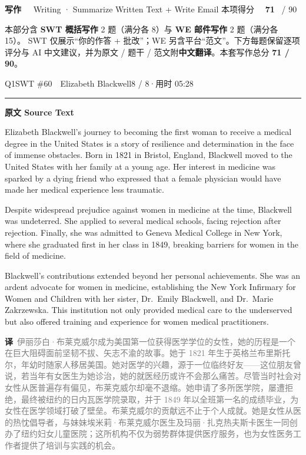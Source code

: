 \documentclass[11pt]{article}
\newcommand{\ptesub}[1]{%
  \par\needspace{2\baselineskip}\smallskip
  {\color{cAccent}\rule[-0.2ex]{3pt}{1.05em}}\hspace{6pt}%
  {\bfseries\color{cHead}#1}\par\nopagebreak\smallskip}
\newcommand{\ptesection}[3]{%
  \addcontentsline{toc}{section}{#1}%
  \needspace{6\baselineskip}
  \begin{tcolorbox}[enhanced, colback=cAccent, colframe=cAccent, sharp corners,
     left=14pt, right=14pt, top=10pt, bottom=10pt, boxrule=0pt]
    {\fontsize{20}{24}\selectfont\bfseries\color{white} #1\ \ }%
    {\large\color{white!85} #2}\hfill
    {\large\color{white}本项得分\ \ }{\fontsize{22}{24}\selectfont\bfseries\color{white} #3}%
    \ {\color{white!85}/ 90}
  \end{tcolorbox}}
\newcommand{\zh}[1]{{\footnotesize\textcolor{cNote}{\textbf{译}}\ \textcolor{gray}{#1}}}
\begin{document}
\ptesection{写作}{Writing · Summarize Written Text + Write Email}{71}

\vspace{1mm}
{\small\color{gray} 本部分含 \textbf{SWT 概括写作} 2 题（满分各 8）与 \textbf{WE 邮件写作} 2 题（满分各 15）。
SWT 仅展示“你的作答 + 批改”；WE 另含平台“范文”。下方每题保留逐项评分与 AI 中文建议，并为原文 / 题干 / 范文附\textbf{中文翻译}。本套写作总分 \textbf{71 / 90}。}
\vspace{2mm}


\begin{qblock}{Q1\quad SWT \#60\ \ Elizabeth Blackwell}{8 / 8\quad·\quad 用时 05:28}

\ptesub{原文 Source Text}
\begin{promptbox}
Elizabeth Blackwell's journey to becoming the first woman to receive a medical degree in the United States is a story of resilience and determination in the face of immense obstacles. Born in 1821 in Bristol, England, Blackwell moved to the United States with her family at a young age. Her interest in medicine was sparked by a dying friend who expressed that a female physician would have made her medical experience less traumatic.

Despite widespread prejudice against women in medicine at the time, Blackwell was undeterred. She applied to several medical schools, facing rejection after rejection. Finally, she was admitted to Geneva Medical College in New York, where she graduated first in her class in 1849, breaking barriers for women in the field of medicine.

Blackwell's contributions extended beyond her personal achievements. She was an ardent advocate for women in medicine, establishing the New York Infirmary for Women and Children with her sister, Dr.\ Emily Blackwell, and Dr.\ Marie Zakrzewska. This institution not only provided medical care to the underserved but also offered training and experience for women medical practitioners.
\end{promptbox}
\zh{伊丽莎白·布莱克威尔成为美国第一位获得医学学位的女性，她的历程是一个在巨大阻碍面前坚韧不拔、矢志不渝的故事。她于 1821 年生于英格兰布里斯托尔，年幼时随家人移居美国。她对医学的兴趣，源于一位临终好友——这位朋友曾说，若当年有女医生为她诊治，她的就医经历或许不会那么痛苦。尽管当时社会对女性从医普遍存有偏见，布莱克威尔却毫不退缩。她申请了多所医学院，屡遭拒绝，最终被纽约的日内瓦医学院录取，并于 1849 年以全班第一名的成绩毕业，为女性在医学领域打破了壁垒。布莱克威尔的贡献远不止于个人成就。她是女性从医的热忱倡导者，与妹妹埃米莉·布莱克威尔医生及玛丽·扎克热夫斯卡医生一同创办了纽约妇女儿童医院；这所机构不仅为弱势群体提供医疗服务，也为女性医务工作者提供了培训与实践的机会。}


\end{qblock}
\end{document}
